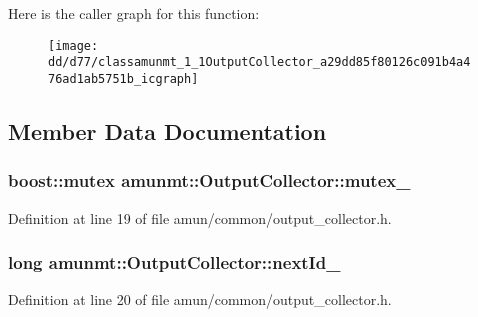Here is the caller graph for this function\+:
\nopagebreak
\begin{figure}[H]
\begin{center}
\leavevmode
\texttt{[image: dd/d77/classamunmt\_1\_1OutputCollector\_a29dd85f80126c091b4a476ad1ab5751b\_icgraph]}
\end{center}
\end{figure}




\subsection{Member Data Documentation}
\subsubsection[{\texorpdfstring{mutex\+\_\+}{mutex_}}]{\setlength{\rightskip}{0pt plus 5cm}boost\+::mutex amunmt\+::\+Output\+Collector\+::mutex\+\_\+\hspace{0.3cm}{\ttfamily [protected]}}\hypertarget{classamunmt_1_1OutputCollector_a817d2d503109791aec798ea340d0dcbe}{}\label{classamunmt_1_1OutputCollector_a817d2d503109791aec798ea340d0dcbe}


Definition at line 19 of file amun/common/output\+\_\+collector.\+h.

\subsubsection[{\texorpdfstring{next\+Id\+\_\+}{nextId_}}]{\setlength{\rightskip}{0pt plus 5cm}long amunmt\+::\+Output\+Collector\+::next\+Id\+\_\+\hspace{0.3cm}{\ttfamily [protected]}}\hypertarget{classamunmt_1_1OutputCollector_a32c7f6ee98058aa27f17e1816364fc2e}{}\label{classamunmt_1_1OutputCollector_a32c7f6ee98058aa27f17e1816364fc2e}


Definition at line 20 of file amun/common/output\+\_\+collector.\+h.

